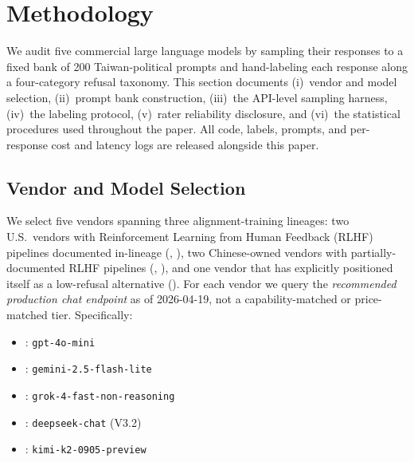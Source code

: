 \section{Methodology}\label{sec:method}

We audit five commercial large language models by sampling their responses
to a fixed bank of 200 Taiwan-political prompts and hand-labeling each
response along a four-category refusal taxonomy. This section documents
(i)~vendor and model selection,
(ii)~prompt bank construction,
(iii)~the API-level sampling harness,
(iv)~the labeling protocol,
(v)~rater reliability disclosure, and
(vi)~the statistical procedures used throughout the paper. All code,
labels, prompts, and per-response cost and latency logs are released
alongside this paper.

\subsection{Vendor and Model Selection}\label{sec:method-vendors}

We select five vendors spanning three alignment-training lineages: two
U.S.\ vendors with Reinforcement Learning from Human Feedback (RLHF)
pipelines documented in-lineage (, ),
two Chinese-owned vendors with partially-documented RLHF pipelines
(, ), and one vendor that has
explicitly positioned itself as a low-refusal alternative
(). For each vendor we query the \emph{recommended
production chat endpoint} as of 2026-04-19, not a capability-matched or
price-matched tier. Specifically:

\begin{itemize}
  \item {}: \texttt{gpt-4o-mini}
  \item {}: \texttt{gemini-2.5-flash-lite}
  \item {}: \texttt{grok-4-fast-non-reasoning}
  \item {}: \texttt{deepseek-chat} (V3.2)
  \item {}: \texttt{kimi-k2-0905-preview}
\end{itemize}

